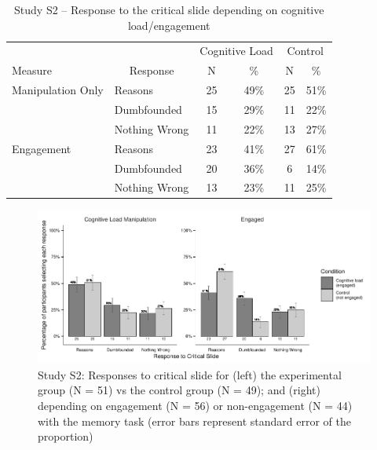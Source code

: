 \documentclass[
  man,floatsintext]{apa6}
\begin{document}
\begin{table}[tbp]

\begin{center}
\begin{threeparttable}

\caption{\label{tab:tabS2tab1dumb1all}Study S2 – Response to the critical slide depending on cognitive load/engagement}

\begin{tabular}{llcccc}
\toprule
 &  & \multicolumn{2}{c}{Cognitive Load} & \multicolumn{2}{c}{Control} \\
\cmidrule(r){3-4} \cmidrule(r){5-6}
Measure & \multicolumn{1}{c}{Response} & \multicolumn{1}{c}{N} & \multicolumn{1}{c}{\%} & \multicolumn{1}{c}{N} & \multicolumn{1}{c}{\%}\\
\midrule
Manipulation Only & Reasons & 25 & 49\% & 25 & 51\%\\
 & Dumbfounded & 15 & 29\% & 11 & 22\%\\
 & Nothing Wrong & 11 & 22\% & 13 & 27\%\\
Engagement & Reasons & 23 & 41\% & 27 & 61\%\\
 & Dumbfounded & 20 & 36\% & 6 & 14\%\\
 & Nothing Wrong & 13 & 23\% & 11 & 25\%\\
\bottomrule
\end{tabular}

\end{threeparttable}
\end{center}

\end{table}

\begin{figure}[!h]
\includegraphics{Supplementary_files/figure-latex/S2figboth-1} \caption{Study S2: Responses to critical slide for (left) the experimental group (N = 51) vs the control group (N = 49); and (right) depending on engagement (N = 56) or non-engagement (N = 44) with the memory task (error bars represent standard error of the proportion)}\label{fig:S2figboth}
\end{figure}
\end{document}
